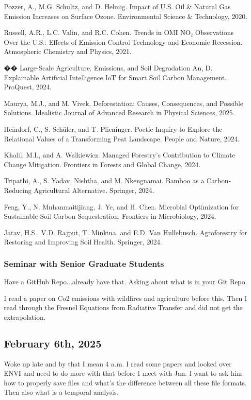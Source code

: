 \documentclass{article}
\begin{document}
Pozzer, A., M.G. Schultz, and D. Helmig. Impact of U.S. Oil & Natural Gas Emission Increases on Surface Ozone. Environmental Science & Technology, 2020.

Russell, A.R., L.C. Valin, and R.C. Cohen. Trends in OMI NO₂ Observations Over the U.S.: Effects of Emission Control Technology and Economic Recession. Atmospheric Chemistry and Physics, 2021.

�� Large-Scale Agriculture, Emissions, and Soil Degradation
An, D. Explainable Artificial Intelligence IoT for Smart Soil Carbon Management. ProQuest, 2024.

Maurya, M.J., and M. Vivek. Deforestation: Causes, Consequences, and Possible Solutions. Idealistic Journal of Advanced Research in Physical Sciences, 2025.

Heindorf, C., S. Schüler, and T. Plieninger. Poetic Inquiry to Explore the Relational Values of a Transforming Peat Landscape. People and Nature, 2024.

Khalil, M.I., and A. Walkiewicz. Managed Forestry’s Contribution to Climate Change Mitigation. Frontiers in Forests and Global Change, 2024.

Tripathi, A., S. Yadav, Nishtha, and M. Nkengnamai. Bamboo as a Carbon-Reducing Agricultural Alternative. Springer, 2024.

Feng, Y., N. Muhanmaitijiang, J. Ye, and H. Chen. Microbial Optimization for Sustainable Soil Carbon Sequestration. Frontiers in Microbiology, 2024.

Jatav, H.S., V.D. Rajput, T. Minkina, and E.D. Van Hullebusch. Agroforestry for Restoring and Improving Soil Health. Springer, 2024.


\subsubsection{Seminar with Senior Graduate Students}
Have a GitHub Repo...already have that. Asking about what is in your Git Repo. 

I read a paper on Co2 emissions with wildfires and agriculture before this. Then I read through the Fresnel Equations from Radiative Transfer and did not get the extrapolation. 

\subsection{February 6th, 2025}
Woke up late and by that I mean 4 a.m. I read some papers and looked over ENVI and need to do more with that before I meet with Jan. I want to ask him how to properly save files and what's the difference between all these file formats. Then also what is a temporal analysis. 
\end{document}
